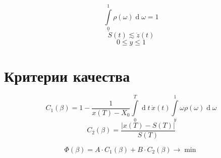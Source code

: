 \documentclass[fleqn]{article}
\renewcommand{\d}[1]{\ensuremath{\operatorname{d}\!{#1}}}
\begin{document}
\begin{equation*}
  \int\limits_0^1 \rho(\omega)\d{\omega} = 1
\end{equation*}
\begin{equation*}
    \dot{S}(t) \lesssim \dot{z}(t)
\end{equation*}
\begin{equation*}
    0 \le y \le 1
\end{equation*}


\section{Критерии качества}

\begin{equation*}
    C_1(\beta) = 1 - \frac{1}{x(T) - X_0} \int\limits_0^T \d{t}\, \dot{x}(t) \int\limits_y^1 \omega\rho(\omega)\d{\omega}
\end{equation*}
\begin{equation*}
    C_2(\beta) = \frac{\left|x(T) - S(T)\right|}{S(T)}
\end{equation*}

\begin{equation*}
    \Phi(\beta) = A \cdot C_1(\beta) + B \cdot C_2(\beta) \rightarrow \operatorname{min}
\end{equation*}
\end{document}

